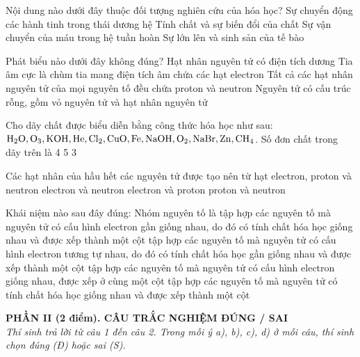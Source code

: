 \documentclass[11pt,a4paper]{article}
\begin{document}
\begin{ex}
Nội dung nào dưới đây thuộc đối tượng nghiên cứu của hóa học?
\choice
{Sự chuyển động các hành tinh trong thái dương hệ}
{\True Tính chất và sự biến đổi của chất}
{Sự vận chuyển của máu trong hệ tuần hoàn}
{Sự lớn lên và sinh sản của tế bào}
\end{ex}
\begin{ex}
Phát biểu nào dưới đây không đúng?
\choice
{Hạt nhân nguyên tử có điện tích dương}
{Tia âm cực là chùm tia mang điện tích âm chứa các hạt electron}
{\True Tất cả các hạt nhân nguyên tử của mọi nguyên tố đều chứa proton và neutron}
{Nguyên tử có cấu trúc rỗng, gồm vỏ nguyên tử và hạt nhân nguyên tử}
\end{ex}
\begin{ex}
Cho dãy chất được biểu diễn bằng công thức hóa học như sau: $\ce{H2O, O3, KOH, He, Cl2, CuO, Fe, NaOH, O2, NaBr, Zn, CH4}$. Số đơn chất trong dãy trên là
\choice
{4}
{}
{5}
{3}
\end{ex}
\begin{ex}
Các hạt nhân của hầu hết các nguyên tử được tạo nên từ hạt
\choice
{electron, proton và neutron}
{electron và neutron}
{electron và proton}
{\True proton và neutron}
\end{ex}
\begin{ex}
Khái niệm nào sau đây đúng: Nhóm nguyên tố là
\choice
{tập hợp các nguyên tố mà nguyên tử có cấu hình electron gần giống nhau, do đó có tính chất hóa học giống nhau và được xếp thành một cột}
{\True tập hợp các nguyên tố mà nguyên tử có cấu hình electron tương tự nhau, do đó có tính chất hóa học gần giống nhau và được xếp thành một cột}
{tập hợp các nguyên tố mà nguyên tử có cấu hình electron giống nhau, được xếp ở cùng một cột}
{tập hợp các nguyên tố mà nguyên tử có tính chất hóa học giống nhau và được xếp thành một cột}
\end{ex}
\vspace{4pt}
\noindent
{\color{mainGreen}\textbf{\large PHẦN II (2 điểm). CÂU TRẮC NGHIỆM ĐÚNG / SAI}}\\
\textit{\small Thí sinh trả lời từ câu 1 đến câu 2. Trong mỗi ý a), b), c), d) ở mỗi câu, thí sinh chọn đúng (Đ) hoặc sai (S).}
\vspace{2pt}
\end{document}
